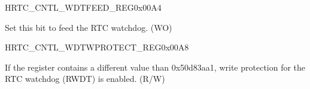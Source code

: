 \begin{register}{H}{RTC\_CNTL\_WDTFEED\_REG}{0x00A4}\label{regdesc:RTCCNTLWDTFEEDREG}
%
%
\regnewline%
\begin{regdesc}\begin{reglist}
\label{fielddesc:RTCCNTLWDTFEED}\item [RTC\_CNTL\_WDT\_FEED] Set this bit to feed the RTC watchdog. (WO)
\end{reglist}\end{regdesc}
\end{register}


\begin{register}{H}{RTC\_CNTL\_WDTWPROTECT\_REG}{0x00A8}\label{regdesc:RTCCNTLWDTWPROTECTREG}
%
\regnewline%
\begin{regdesc}\begin{reglist}
\label{fielddesc:RTCCNTLWDTWKEY}\item [RTC\_CNTL\_WDT\_WKEY] If the register contains a different value than 0x50d83aa1, write protection for the RTC watchdog (RWDT) is enabled. (R/W)
\end{reglist}\end{regdesc}
\end{register}



